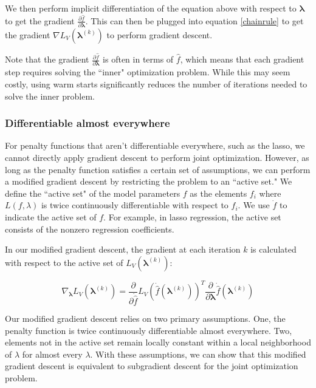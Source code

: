 \documentclass[10pt,letterpaper]{article}
\begin{document}
We then perform implicit differentiation of the equation above with respect to $\boldsymbol{\lambda}$ to get the gradient $\frac{\partial \hat f}{\partial \boldsymbol{\lambda}}$. This can then be plugged into equation \ref{chainrule} to get the gradient $\nabla{L_V}(\boldsymbol{\lambda}^{(k)})$ to perform gradient descent.

Note that the gradient $\frac{\partial \hat f}{\partial \boldsymbol{\lambda}}$ is often in terms of $\hat f$, which means that each gradient step requires solving the ``inner" optimization problem. While this may seem costly, using warm starts significantly reduces the number of iterations needed to solve the inner problem.

\subsubsection{Differentiable almost everywhere}

For penalty functions that aren't differentiable everywhere, such as the lasso, we cannot directly apply gradient descent to perform joint optimization. However, as long as the penalty function satisfies a certain set of assumptions, we can perform a modified gradient descent by restricting the problem to an ``active set." We define the ``active set" of the model parameters $f$ as the elements $f_i$ where $L(f, \lambda)$ is twice continuously differentiable with respect to $f_i$. We use $\dot f$ to indicate the active set of $f$. For example, in lasso regression, the active set consists of the nonzero regression coefficients.

In our modified gradient descent, the gradient at each iteration $k$ is calculated with respect to the active set of $L_V(\boldsymbol{\lambda}^{(k)})$:

\begin{equation}
\nabla_{\boldsymbol{\lambda}} L_V(\boldsymbol{\lambda}^{(k)}) = \frac{\partial}{\partial \dot{\hat{f}}} L_V(\dot{\hat{f}}(\boldsymbol{\lambda}^{(k)}))^T \frac{\partial}{\partial \boldsymbol{\lambda}} \dot{\hat{f}}(\boldsymbol{\lambda}^{(k)})
\end{equation}

Our modified gradient descent relies on two primary assumptions. One, the penalty function is twice continuously differentiable almost everywhere. Two, elements not in the active set remain locally constant within a local neighborhood of $\lambda$ for almost every $\lambda$. With these assumptions, we can show that this modified gradient descent is equivalent to subgradient descent for the joint optimization problem.
\end{document}
